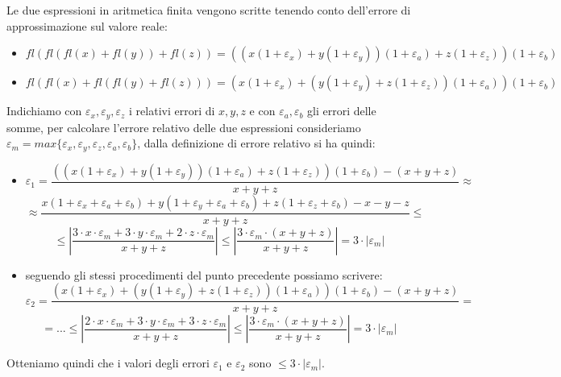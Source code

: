 \begin{flushleft}
Le due espressioni in aritmetica finita vengono scritte tenendo conto dell'errore di approssimazione sul valore reale:
\begin{itemize}
\item $fl(fl(fl(x)+fl(y))+fl(z)) = ((x(1+\varepsilon_{x})+y(1+\varepsilon_{y}))(1+\varepsilon_{a})+z(1+\varepsilon_{z}))(1+\varepsilon_{b})$
\item $fl(fl(x)+fl(fl(y)+fl(z))) = (x(1+\varepsilon_{x})+(y(1+\varepsilon_{y})+z(1+\varepsilon_{z}))(1+\varepsilon_{a}))(1+\varepsilon_{b})$
\end{itemize}
Indichiamo con $\varepsilon_{x},\varepsilon_{y},\varepsilon_{z}$ i relativi errori di $x, y, z$ e con $\varepsilon_{a},\varepsilon_{b}$ gli errori delle somme, per calcolare l'errore relativo delle due espressioni consideriamo $\varepsilon_{m} = max\{\varepsilon_{x},\varepsilon_{y},\varepsilon_{z},\varepsilon_{a},\varepsilon_{b}\}$, dalla definizione di errore relativo si ha quindi:
\begin{itemize}
    \item 
    \[ 
    \varepsilon_{1} = \frac{((x(1+\varepsilon_{x})+y(1+\varepsilon_{y}))(1+\varepsilon_{a})+z(1+\varepsilon_{z}))(1+\varepsilon_{b})-(x+y+z)}{x+y+z} \approx
    \]
    \[
    \approx \frac{x(1+\varepsilon_{x}+\varepsilon_{a}+\varepsilon_{b})+y(1+\varepsilon_{y}+\varepsilon_{a}+\varepsilon_{b})+z(1+\varepsilon_{z}+\varepsilon_{b})-x-y-z}{x+y+z} \leq
    \]
    \[ 
    \leq \left|\frac{3\cdot x\cdot\varepsilon_{m}+ 3\cdot y\cdot\varepsilon_{m} + 2\cdot z\cdot\varepsilon_{m}}{x+y+z}\right| \leq \left|\frac{3\cdot\varepsilon_{m}\cdot(x+y+z)}{x+y+z}\right| = 3\cdot\left|\varepsilon_{m}\right|
    \]
    \item seguendo gli stessi procedimenti del punto precedente possiamo scrivere:
    \[
    \varepsilon_{2} = \frac{(x(1+\varepsilon_{x})+(y(1+\varepsilon_{y})+z(1+\varepsilon_{z}))(1+\varepsilon_{a}))(1+\varepsilon_{b})-(x+y+z)}{x+y+z} = 
    \]
    \[
    = ... \leq \left|\frac{2\cdot x\cdot\varepsilon_{m}+ 3\cdot y\cdot\varepsilon_{m} + 3\cdot z\cdot\varepsilon_{m}}{x+y+z}\right| \leq \left|\frac{3\cdot\varepsilon_{m}\cdot(x+y+z)}{x+y+z}\right| = 3\cdot\left|\varepsilon_{m}\right|
    \]
\end{itemize}

Otteniamo quindi che i valori degli errori $\varepsilon_{1}$ e $\varepsilon_{2}$ sono $\leq 3\cdot\left|\varepsilon_{m}\right|$.
\end{flushleft}